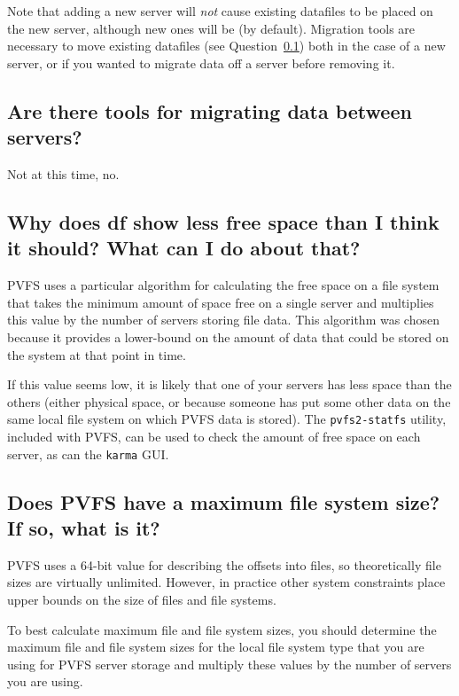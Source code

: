 \documentclass[11pt,letterpaper]{article}
\begin{document}
Note that adding a new server will \emph{not} cause existing datafiles to be
placed on the new server, although new ones will be (by default).  Migration
tools are necessary to move existing datafiles (see
Question~\ref{sec:migration}) both in the case of a new server, or if you
wanted to migrate data off a server before removing it.

\subsection{Are there tools for migrating data between servers?}
\label{sec:migration}

Not at this time, no.

\subsection{Why does df show less free space than I think it should? What
            can I do about that?}
\label{sec:df-free-space}

PVFS uses a particular algorithm for calculating the free space on a file
system that takes the minimum amount of space free on a single server and
multiplies this value by the number of servers storing file data.
%
This algorithm was chosen because it provides a lower-bound on the amount of
data that could be stored on the system at that point in time.

If this value seems low, it is likely that one of your servers has less space
than the others (either physical space, or because someone has put some other
data on the same local file system on which PVFS data is stored).  The
\texttt{pvfs2-statfs} utility, included with PVFS, can be used to check the
amount of free space on each server, as can the \texttt{karma} GUI.

\subsection{Does PVFS have a maximum file system size? If so, what is it?}

PVFS uses a 64-bit value for describing the offsets into files, so
theoretically file sizes are virtually unlimited.  However, in practice other
system constraints place upper bounds on the size of files and file systems.

To best calculate maximum file and file system sizes, you should determine the
maximum file and file system sizes for the local file system type that you are
using for PVFS server storage and multiply these values by the number of
servers you are using.
\end{document}
